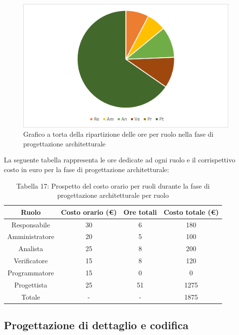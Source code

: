 \begin{figure}[H]
    \centering
    \includegraphics[scale=0.6]{img/grafi preventivo/torta/architetturale/complessivo.png}
    \caption{Grafico a torta della ripartizione delle ore per ruolo nella fase di progettazione architetturale}
\end{figure}
La seguente tabella rappresenta le ore dedicate ad ogni ruolo e il corrispettivo costo in euro per la fase di progettazione architetturale:
\begin{table}[h]
	\setlength\extrarowheight{5pt}
	\centering
	\begin{tabularx}{\textwidth}{|ccc|c|}
		\hline
		\rowcolor{white}
		\textbf{Ruolo} & \textbf{Costo orario (€)} & \textbf{Ore totali} & \textbf{Costo totale (€)} \\
		\hline
		Responsabile &30&6&180 \\
		Amministratore &20&5&100 \\
		Analista &25&8&200 \\
		Verificatore &15&8&120 \\
		Programmatore &15&0&0 \\
		Progettista &25&51&1275 \\
		\hline
		Totale &-&-&1875 \\
		\hline
	\end{tabularx}
    \vspace{10pt}
	\caption{Tabella 17: Prospetto del costo orario per ruoli durante la fase di progettazione architetturale per ruolo}
\end{table}
\subsection{Progettazione di dettaglio e codifica}
